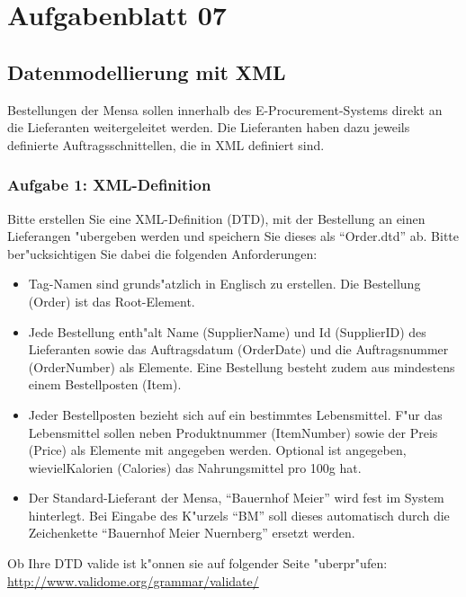 
\chapter{Aufgabenblatt 07}

\section{Datenmodellierung mit XML}
Bestellungen der Mensa sollen innerhalb des E-Procurement-Systems direkt an die Lieferanten weitergeleitet werden.
Die Lieferanten haben dazu jeweils definierte Auftragsschnittellen, die in XML definiert sind.\\

\subsection{Aufgabe 1: XML-Definition}
Bitte erstellen Sie eine XML-Definition (DTD), mit der Bestellung an einen Lieferangen "ubergeben werden und speichern Sie dieses als "`Order.dtd"' ab.
Bitte ber"ucksichtigen Sie dabei die folgenden Anforderungen:
\begin{itemize}
    \item Tag-Namen sind grunds"atzlich in Englisch zu erstellen.
    Die Bestellung (Order) ist das Root-Element.
    \item Jede Bestellung enth"alt Name (SupplierName) und Id (SupplierID) des Lieferanten sowie das Auftragsdatum (OrderDate) und die Auftragsnummer (OrderNumber) als Elemente.
    Eine Bestellung besteht zudem aus mindestens einem Bestellposten (Item).
    \item Jeder Bestellposten bezieht sich auf ein bestimmtes Lebensmittel.
    F"ur das Lebensmittel sollen neben Produktnummer (ItemNumber) sowie der Preis (Price) als Elemente mit angegeben werden.
    Optional ist angegeben, wievielKalorien (Calories) das Nahrungsmittel pro 100g hat.
    \item Der Standard-Lieferant der Mensa, "`Bauernhof Meier"' wird fest im System hinterlegt.
    Bei Eingabe des K"urzels "`BM"' soll dieses automatisch durch die Zeichenkette "`Bauernhof Meier Nuernberg"' ersetzt werden.
\end{itemize}

\noindent
Ob Ihre DTD valide ist k"onnen sie auf folgender Seite "uberpr"ufen:\\
\url{http://www.validome.org/grammar/validate/}\\




